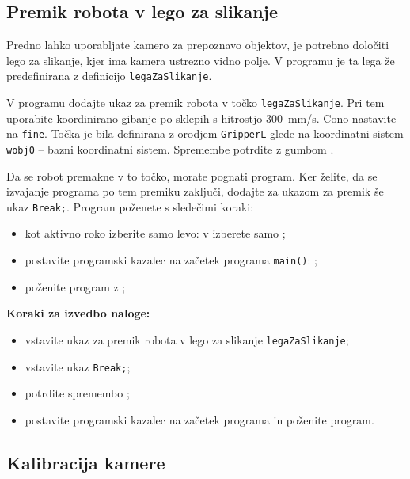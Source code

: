 \subsection{Premik robota v lego za slikanje}

Predno lahko uporabljate kamero za prepoznavo objektov, je potrebno določiti lego za slikanje, kjer ima kamera ustrezno vidno polje.
V programu je ta lega že predefinirana z definicijo \verb"legaZaSlikanje".

V programu dodajte ukaz za premik robota v točko \verb"legaZaSlikanje". Pri tem uporabite koordinirano gibanje po sklepih s hitrostjo 300~mm/s. Cono nastavite na \verb"fine". Točka je bila definirana z orodjem  \verb"GripperL" glede na koordinatni sistem \verb"wobj0" -- bazni koordinatni sistem. Spremembe potrdite z gumbom .

Da se robot premakne v to točko, morate pognati program. Ker želite, da se izvajanje programa po tem premiku zaključi, dodajte za ukazom za premik še ukaz \verb"Break;". Program poženete s sledečimi koraki:
\begin{itemize}
  \item kot aktivno roko izberite samo levo: v  izberete samo ;
  \item postavite programski kazalec na začetek programa \verb"main()": ;
  \item poženite program z ;
\end{itemize}

\vspace{5mm}

\begin{mdframed}[backgroundcolor=yellow!20, shadow=true,roundcorner=8pt]
\textbf{Koraki za izvedbo naloge:}
\begin{itemize}
  \item vstavite ukaz za premik robota v lego za slikanje \verb"legaZaSlikanje";
  \item vstavite ukaz \verb"Break;";
  \item potrdite spremembo ;
  \item postavite programski kazalec na začetek programa in poženite program.
\end{itemize}
\end{mdframed}

\subsection{Kalibracija kamere}
\label{ch:kalibracija_kamere}

